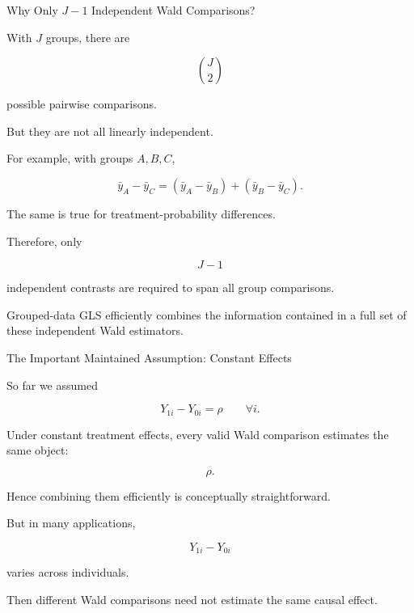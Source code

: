 \documentclass[aspectratio=169]{beamer}
\begin{document}
\begin{frame}{Why Only \(J-1\) Independent Wald Comparisons?}

With \(J\) groups, there are

\[
\binom{J}{2}
\]

possible pairwise comparisons.

But they are not all linearly independent.

For example, with groups \(A,B,C\),

\[
\bar y_A-\bar y_C
=
(\bar y_A-\bar y_B)
+
(\bar y_B-\bar y_C).
\]

The same is true for treatment-probability differences.

Therefore, only

\[
\boxed{J-1}
\]

independent contrasts are required to span all group comparisons.

Grouped-data GLS efficiently combines the information contained in a full set of these independent Wald estimators.

\end{frame}

\begin{frame}{The Important Maintained Assumption: Constant Effects}

So far we assumed

\[
\boxed{
Y_{1i}-Y_{0i}=\rho
\qquad
\forall i.
}
\]

Under constant treatment effects, every valid Wald comparison estimates the same object:

\[
\rho.
\]

Hence combining them efficiently is conceptually straightforward.

\vspace{0.4cm}

But in many applications,

\[
Y_{1i}-Y_{0i}
\]

varies across individuals.

Then different Wald comparisons need not estimate the same causal effect.

\end{frame}
\end{document}
